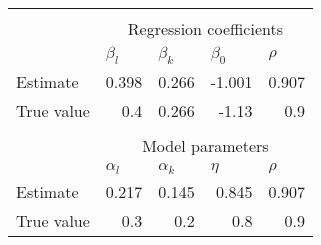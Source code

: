 \begin{tabular}{lrrrr}
\toprule
\toprule
          &           &           &           &  \\
          & \multicolumn{4}{c}{Regression coefficients} \\
\cmidrule{2-5}          & \multicolumn{1}{l}{$\beta_l$} & \multicolumn{1}{l}{$\beta_k$} & \multicolumn{1}{l}{$\beta_0$} & \multicolumn{1}{l}{$\rho$} \\
Estimate  & 0.398     & 0.266     & -1.001    & 0.907 \\
True value & 0.4       & 0.266     & -1.13     & 0.9 \\
\midrule
          &           &           &           &  \\
          & \multicolumn{4}{c}{Model parameters} \\
\cmidrule{2-5}          & \multicolumn{1}{l}{$\alpha_l$} & \multicolumn{1}{l}{$\alpha_k$} & \multicolumn{1}{l}{$\eta$} & \multicolumn{1}{l}{$\rho$} \\
\cmidrule{2-5}Estimate  & 0.217     & 0.145     & 0.845     & 0.907 \\
True value & 0.3       & 0.2       & 0.8       & 0.9 \\
\bottomrule
\bottomrule
\end{tabular}%
